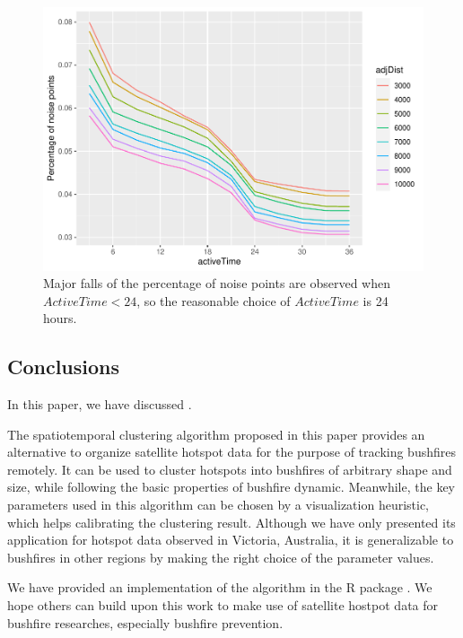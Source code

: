 \begin{Schunk}
\begin{figure}

{\centering \includegraphics[width=0.8\linewidth]{clustering_paper_files/figure-latex/vis2-1} 

}

\caption[Major falls of the percentage of noise points are observed when $ActiveTime < 24$, so the reasonable choice of $ActiveTime$ is 24 hours]{Major falls of the percentage of noise points are observed when $ActiveTime < 24$, so the reasonable choice of $ActiveTime$ is 24 hours.}\label{fig:vis2}
\end{figure}
\end{Schunk}

\hypertarget{conclusions}{%
\subsection{Conclusions}\label{conclusions}}

In this paper, we have discussed .

The spatiotemporal clustering algorithm proposed in this paper provides
an alternative to organize satellite hotspot data for the purpose of
tracking bushfires remotely. It can be used to cluster hotspots into
bushfires of arbitrary shape and size, while following the basic
properties of bushfire dynamic. Meanwhile, the key parameters used in
this algorithm can be chosen by a visualization heuristic, which helps
calibrating the clustering result. Although we have only presented its
application for hotspot data observed in Victoria, Australia, it is
generalizable to bushfires in other regions by making the right choice
of the parameter values.

We have provided an implementation of the algorithm in the R package
. We hope others can build upon this work to make use
of satellite hostpot data for bushfire researches, especially bushfire
prevention.

